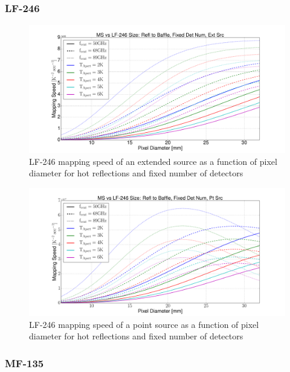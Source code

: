 \documentclass[12pt, titlepage]{article} %
\begin{document}

\subsubsection{LF-246}

\begin{figure}[H]
	\centering
	\includegraphics[width=1.1\textwidth, center]{PDF/LFT_MS_LF-246_hotRefl_fixDetNum_extSrc.pdf}
	\caption{LF-246 mapping speed of an extended source as a function of pixel diameter for hot reflections and fixed number of detectors}
\end{figure}

\begin{figure}[H]
	\centering
	\includegraphics[width=1.1\textwidth, center]{PDF/LFT_MS_LF-246_hotRefl_fixDetNum_ptSrc.pdf}
	\caption{LF-246 mapping speed of a point source as a function of pixel diameter for hot reflections and fixed number of detectors}
\end{figure}


\subsubsection{MF-135}
\end{document}
